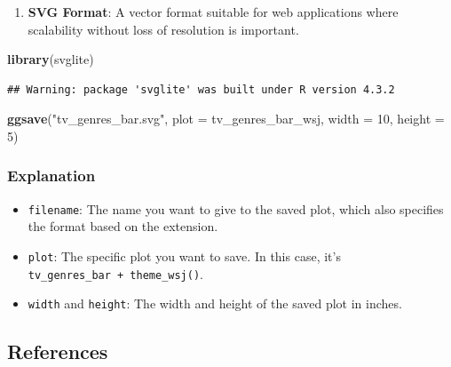 \documentclass[
  b5paper]{book}
\newenvironment{Shaded}{\begin{snugshade}}{\end{snugshade}}
\newcommand{\AttributeTok}[1]{\textcolor[rgb]{0.13,0.29,0.53}{#1}}
\newcommand{\DecValTok}[1]{\textcolor[rgb]{0.00,0.00,0.81}{#1}}
\newcommand{\FunctionTok}[1]{\textcolor[rgb]{0.13,0.29,0.53}{\textbf{#1}}}
\newcommand{\NormalTok}[1]{#1}
\newcommand{\StringTok}[1]{\textcolor[rgb]{0.31,0.60,0.02}{#1}}
\providecommand{\tightlist}{%
  \setlength{\itemsep}{0pt}\setlength{\parskip}{0pt}}
\begin{document}
\begin{enumerate}
\def\labelenumi{\arabic{enumi}.}
\setcounter{enumi}{3}
\tightlist
\item
  \textbf{SVG Format}: A vector format suitable for web applications where scalability without loss of resolution is important.
\end{enumerate}

\begin{Shaded}
\begin{Highlighting}[]
\FunctionTok{library}\NormalTok{(svglite)}
\end{Highlighting}
\end{Shaded}

\begin{verbatim}
## Warning: package 'svglite' was built under R version 4.3.2
\end{verbatim}

\begin{Shaded}
\begin{Highlighting}[]
\FunctionTok{ggsave}\NormalTok{(}\StringTok{"tv\_genres\_bar.svg"}\NormalTok{, }\AttributeTok{plot =}\NormalTok{ tv\_genres\_bar\_wsj, }\AttributeTok{width =} \DecValTok{10}\NormalTok{, }\AttributeTok{height =} \DecValTok{5}\NormalTok{)}
\end{Highlighting}
\end{Shaded}

\hypertarget{explanation}{%
\subsubsection*{Explanation}\label{explanation}}

\begin{itemize}
\tightlist
\item
  \texttt{filename}: The name you want to give to the saved plot, which also specifies the format based on the extension.
\item
  \texttt{plot}: The specific plot you want to save. In this case, it's \texttt{tv\_genres\_bar\ +\ theme\_wsj()}.
\item
  \texttt{width} and \texttt{height}: The width and height of the saved plot in inches.
\end{itemize}

\hypertarget{references-2}{%
\subsection*{References}\label{references-2}}
\end{document}
